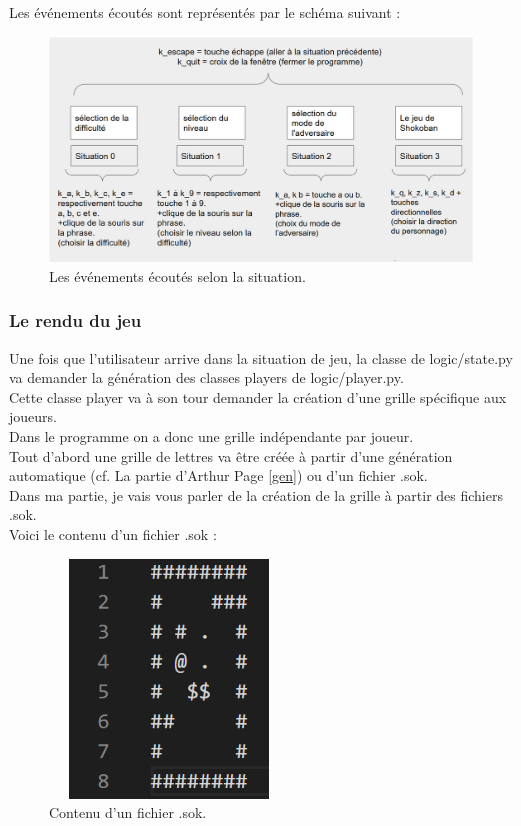 \documentclass[a4paper,12pt]{article}
\begin{document}
Les événements écoutés sont représentés par le schéma suivant :

\begin{figure}[H]
\includegraphics[width=\linewidth]{./Illustrations/state_4.png}
\caption{Les événements écoutés selon la situation.}
\end{figure}

\newpage

\subsubsection{Le rendu du jeu}

Une fois que l'utilisateur arrive dans la situation de jeu,
la classe de logic/state.py va demander la génération des classes players de logic/player.py.\\

Cette classe player va à son tour demander la création d'une grille spécifique aux joueurs.\\
Dans le programme on a donc une grille indépendante par joueur.\\

Tout d'abord une grille de lettres va être créée à partir d'une génération automatique (cf. La partie d'Arthur Page \ref{gen}) ou d'un fichier .sok.\\

Dans ma partie, je vais vous parler de la création de la grille à partir des fichiers .sok.\\

Voici le contenu d'un fichier .sok :

\begin{figure}[H]
\begin{center}
\includegraphics[width=2.5in, height=2.5in]{./Illustrations/map_1.png}
\end{center}
\caption{Contenu d'un fichier .sok.}
\end{figure}
\end{document}
